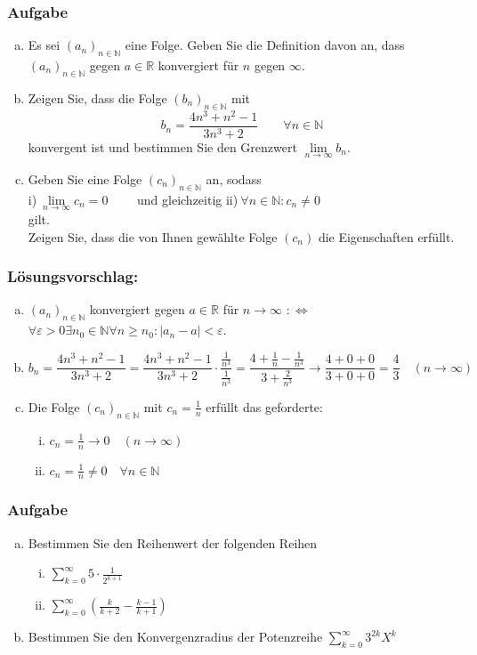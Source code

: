 \documentclass[a4paper,11pt]{scrartcl}
\newcounter{auf}
\newcommand{\Aufgabe}%
        {\addtocounter{auf}{1} \subsubsection*{\rmfamily  Aufgabe \theauf \hspace{1em}} }
\newcommand{\N}{\mathbb{N}}
\newcommand{\RR}{\mathbb{R}}
\begin{document}
\Aufgabe

\begin{enumerate}[a)]

\item Es sei $(a_n)_{n \in \N}$ eine Folge. Geben Sie die Definition davon an, dass $(a_n)_{n \in \N}$ gegen $a \in \RR$ konvergiert für $n$ gegen $\infty$.
\item Zeigen Sie, dass die Folge $(b_n)_{n \in \N}$ mit 
$$
b_n=\frac{4n^3+n^2-1}{3n^3+2} \qquad \forall n \in \N
$$
konvergent ist und bestimmen Sie den Grenzwert $\lim \limits_{n\to \infty} b_n$.
\item Geben Sie eine Folge $(c_n)_{n \in \N}$ an, sodass \vspace{3mm}\\
\hspace*{5mm} i)$\ \lim \limits_{n \to \infty}c_n=0 \qquad$ und gleichzeitig \qquad ii)$\ \forall n \in \N: c_n \ne 0$ \vspace{3mm}\\
gilt. \\
Zeigen Sie, dass die von Ihnen gewählte Folge $(c_n)$ die Eigenschaften erfüllt.
\end{enumerate}

\subsubsection*{Lösungsvorschlag:}
	\begin{enumerate}[a)]
	\item $(a_n)_{n \in \N}$ konvergiert gegen $a \in \RR$ für $n \to \infty$ $:\Leftrightarrow$ $\forall \varepsilon >0 \exists n_0 \in \N \forall n \ge n_0: |a_n-a|<\varepsilon$.
	\item 
	$$
	b_n=\frac{4n^3+n^2-1}{3n^3+2}=\frac{4n^3+n^2-1}{3n^3+2}\cdot \frac{\frac{1}{n^3}}{\frac{1}{n^3}}=\frac{4+\frac{1}{n}-\frac{1}{n^3}}{3+\frac{2}{n^3}} \to \frac{4+0+0}{3+0+0}=\frac{4}{3} \quad (n \to \infty)
	$$
	\item Die Folge $(c_n)_{n \in \N}$ mit $c_n=\frac{1}{n}$ erfüllt das geforderte:
		\begin{enumerate}[i)]
		\item $c_n=\frac{1}{n} \to 0 \quad (n \to \infty)$
		\item $c_n=\frac{1}{n} \ne 0 \quad \forall n \in \N$
		\end{enumerate}
	\end{enumerate}


\newpage
\Aufgabe
\begin{enumerate}[a)]
\item Bestimmen Sie den Reihenwert der folgenden Reihen
	\begin{enumerate}[i)]
	\item $\sum \limits_{k=0}^\infty 5\cdot \frac{1}{2^{k+1}}$
	\item $\sum \limits_{k=0}^\infty\left( \frac{k}{k+2}-\frac{k-1}{k+1}\right)$
	\end{enumerate}
\item Bestimmen Sie den Konvergenzradius der Potenzreihe $\sum \limits_{k=0}^\infty 3^{2k} X^k$
\end{enumerate}
\end{document}
